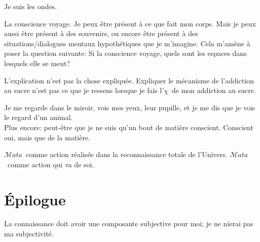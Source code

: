 \documentclass[11pt,a4paper]{article}
\newcommand{\mata}{$\mathcal{M}ata$}
\newcommand{\xp}{$\chi$}
\begin{document}
%
\begin{I}
Je suis les ondes.
\end{I}
%
\begin{I}\newline
{}
\end{I}
%
\begin{I}
La conscience voyage. Je peux être présent à ce que fait mon corps. Mais je peux
aussi être présent à des souvenirs, ou encore être présent à des situations/dialogues mentaux hypothétiques que je m'imagine. Cela m'amène à poser la question suivante: Si la conscience voyage, quels sont les espaces dans lesquels elle se meut?
\end{I}
%
\begin{I}
L'explication n'est pas la chose expliquée. Expliquer le mécanisme de l'addiction au sucre n'est pas ce que je ressens lorsque je fais l'\xp~de mon addiction au sucre.
\end{I}
%
\begin{I}
Je me regarde dans le miroir, vois mes yeux, leur pupille, et je me dis que je vois le regard d'un animal.\\
Plus encore: peut-être que je ne suis qu'un bout de matière conscient. Conscient
oui, mais que de la matière.
\end{I}

\begin{I}\mata~comme action réalisée dans la reconnaissance totale de 
l'Univers. \mata~comme action qui va de soi.\end{I}
\newpage

\section*{Épilogue}
\noindent La connaissance doit avoir une composante subjective pour moi; je ne nierai pas ma subjectivité.
\end{document}
